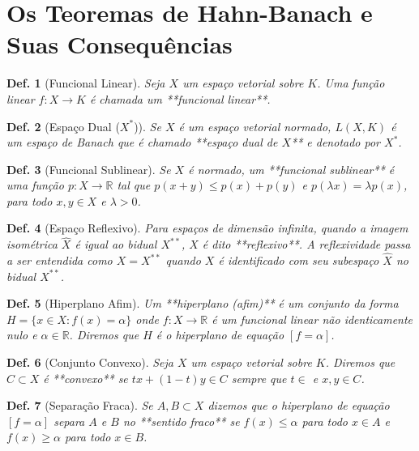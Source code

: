 \documentclass[11pt]{article}
\theoremstyle{yellowhead}
\theoremstyle{yellowdef}
\newtheorem*{definition}{Def.}
\begin{document}
\section{Os Teoremas de Hahn-Banach e Suas Consequências}
\begin{multicols}{3}
\begin{definition}[Funcional Linear]
Seja $X$ um espaço vetorial sobre $K$. Uma função linear $f : X \rightarrow K$ é chamada um **funcional linear**.
\end{definition}

\begin{definition}[Espaço Dual ($X^*$)]
Se $X$ é um espaço vetorial normado, $L(X ,K)$ é um espaço de Banach que é chamado **espaço dual de $X$** e denotado por $X^*$.
\end{definition}

\begin{definition}[Funcional Sublinear]
Se $X$ é normado, um **funcional sublinear** é uma função $p : X \rightarrow \mathbb{R}$ tal que $p(x+y) \le p(x) + p(y)$ e $p(\lambda x) = \lambda p(x)$, para todo $x, y \in X$ e $\lambda > 0$.
\end{definition}

\begin{definition}[Espaço Reflexivo]
Para espaços de dimensão infinita, quando a imagem isométrica $\hat{X}$ é igual ao bidual $X^{**}$, $X$ é dito **reflexivo**. A reflexividade passa a ser entendida como $X = X^{**}$ quando $X$ é identificado com seu subespaço $\hat{X}$ no bidual $X^{**}$.
\end{definition}

\begin{definition}[Hiperplano Afim]
Um **hiperplano (afim)** é um conjunto da forma $H = \{x \in X : f(x) = \alpha\}$ onde $f : X \rightarrow \mathbb{R}$ é um funcional linear não identicamente nulo e $\alpha \in \mathbb{R}$. Diremos que $H$ é o hiperplano de equação $[f = \alpha]$.
\end{definition}

\begin{definition}[Conjunto Convexo]
Seja $X$ um espaço vetorial sobre $K$. Diremos que $C \subset X$ é **convexo** se $tx + (1-t)y \in C$ sempre que $t \in$ e $x, y \in C$.
\end{definition}

\begin{definition}[Separação Fraca]
Se $A, B \subset X$ dizemos que o hiperplano de equação $[f = \alpha]$ separa $A$ e $B$ no **sentido fraco** se $f(x) \le \alpha$ para todo $x \in A$ e $f(x) \ge \alpha$ para todo $x \in B$.
\end{definition}


\end{multicols}
\end{document}

